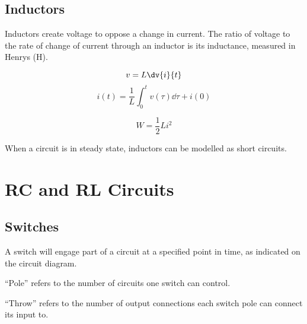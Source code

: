 \documentclass{article}
\begin{document}
\subsection{Inductors}
\begin{definition}
    Inductors create voltage to oppose a change in current. The ratio of voltage
    to the rate of change of current through an inductor is its inductance, measured in Henrys (\si{\henry}).
\end{definition}
\begin{definition}[VI Relationship]
    \begin{equation*}
        v = L \dv{i}{t}
    \end{equation*}
    \begin{equation*}
        i(t) = \frac{1}{L} \int_0^t v(\tau) \dd{\tau} + i(0)
    \end{equation*}
\end{definition}
\begin{definition}
    \begin{equation*}
        W = \frac{1}{2}Li^2
    \end{equation*}
\end{definition}
\begin{theorem}
    When a circuit is in steady state, inductors can be modelled as short circuits.
\end{theorem}
\newpage
\section{RC and RL Circuits}
\subsection{Switches}
\begin{definition}
    A switch will engage part of a circuit at a specified point in time, as indicated
    on the circuit diagram.
\end{definition}
\begin{definition}[Poles]
    ``Pole'' refers to the number of circuits one switch can control.
\end{definition}
\begin{definition}[Throw]
    ``Throw'' refers to the number of output connections each switch
    pole can connect its input to.
\end{definition}
\end{document}

